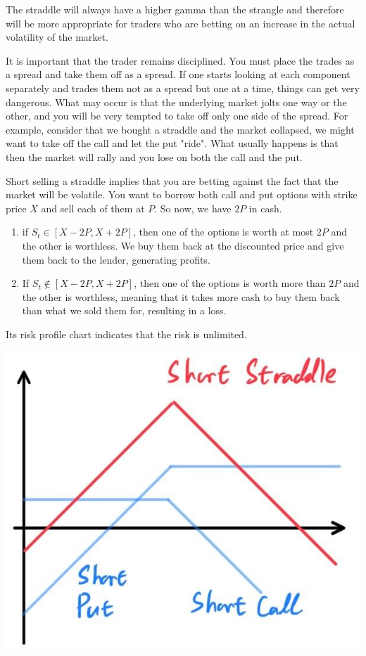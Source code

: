 \documentclass{article}
\begin{document}
\begin{theorem}
The straddle will always have a higher gamma than the strangle and therefore will be more appropriate for traders who are betting on an increase in the actual volatility of the market. 
\end{theorem}

It is important that the trader remains disciplined. You must place the trades as a spread and take them off as a spread. If one starts looking at each component separately and trades them not as a spread but one at a time, things can get very dangerous. What may occur is that the underlying market jolts one way or the other, and you will be very tempted to take off only one side of the spread. For example, consider that we bought a straddle and the market collapsed, we might want to take off the call and let the put "ride". What usually happens is that then the market will rally and you lose on both the call and the put. 

\begin{definition}
Short selling a straddle implies that you are betting against the fact that the market will be volatile. You want to borrow both call and put options with strike price $X$ and sell each of them at $P$. So now, we have $2P$ in cash. 
\begin{enumerate}
    \item if $S_t \in [X - 2P, X + 2P]$, then one of the options is worth at most $2P$ and the other is worthless. We buy them back at the discounted price and give them back to the lender, generating profits. 
    
    \item If $S_t \not\in [X - 2P, X + 2P]$, then one of the options is worth more than $2P$ and the other is worthless, meaning that it takes more cash to buy them back than what we sold them for, resulting in a loss. 
\end{enumerate}
Its risk profile chart indicates that the risk is unlimited. 
\begin{center}
    \includegraphics[scale=0.3]{img/short_straddle.jpg}
\end{center}
\end{definition}
\end{document}
